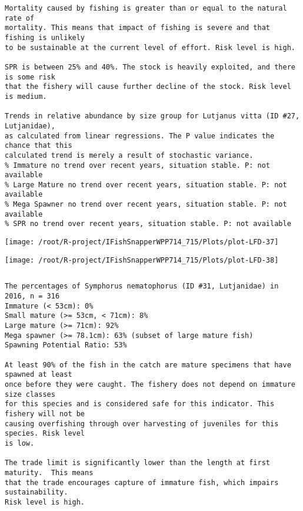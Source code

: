 \documentclass{report}\usepackage[]{graphicx}\usepackage[]{color}
\makeatletter
\def\maxwidth{ %
  \ifdim\Gin@nat@width>\linewidth
    \linewidth
  \else
    \Gin@nat@width
  \fi
}
\newenvironment{kframe}{%
 \def\at@end@of@kframe{}%
 \ifinner\ifhmode%
  \def\at@end@of@kframe{\end{minipage}}%
  \begin{minipage}{\columnwidth}%
 \fi\fi%
 \def\FrameCommand##1{\hskip\@totalleftmargin \hskip-\fboxsep
 \colorbox{shadecolor}{##1}\hskip-\fboxsep
     \hskip-\linewidth \hskip-\@totalleftmargin \hskip\columnwidth}%
 \MakeFramed {\advance\hsize-\width
   \@totalleftmargin\z@ \linewidth\hsize
   \@setminipage}}%
 {\par\unskip\endMakeFramed%
 \at@end@of@kframe}
\newenvironment{knitrout}{}{} %
\makeatother
\begin{document}
\begin{knitrout}
\begin{kframe}
\begin{verbatim}
Mortality caused by fishing is greater than or equal to the natural rate of
mortality. This means that impact of fishing is severe and that fishing is unlikely
to be sustainable at the current level of effort. Risk level is high.
 
SPR is between 25% and 40%. The stock is heavily exploited, and there is some risk
that the fishery will cause further decline of the stock. Risk level is medium.
 
Trends in relative abundance by size group for Lutjanus vitta (ID #27, Lutjanidae),
as calculated from linear regressions. The P value indicates the chance that this
calculated trend is merely a result of stochastic variance.
% Immature no trend over recent years, situation stable. P: not available
% Large Mature no trend over recent years, situation stable. P: not available
% Mega Spawner no trend over recent years, situation stable. P: not available
% SPR no trend over recent years, situation stable. P: not available
\end{verbatim}
\end{kframe}
\texttt{[image: /root/R-project/IFishSnapperWPP714\_715/Plots/plot-LFD-37]} 

\texttt{[image: /root/R-project/IFishSnapperWPP714\_715/Plots/plot-LFD-38]} 
\begin{kframe}\begin{verbatim}
\end{verbatim}
\end{kframe}
\clearpage
\newpage
\begin{kframe}\begin{verbatim}The percentages of Symphorus nematophorus (ID #31, Lutjanidae) in 2016, n = 316
Immature (< 53cm): 0%
Small mature (>= 53cm, < 71cm): 8%
Large mature (>= 71cm): 92%
Mega spawner (>= 78.1cm): 63% (subset of large mature fish)
Spawning Potential Ratio: 53%
 
At least 90% of the fish in the catch are mature specimens that have spawned at least
once before they were caught. The fishery does not depend on immature size classes
for this species and is considered safe for this indicator. This fishery will not be
causing overfishing through over harvesting of juveniles for this species. Risk level
is low.

The trade limit is significantly lower than the length at first maturity.  This means
that the trade encourages capture of immature fish, which impairs sustainability.
Risk level is high.


\end{verbatim}
\end{kframe}
\end{knitrout}
\end{document}
